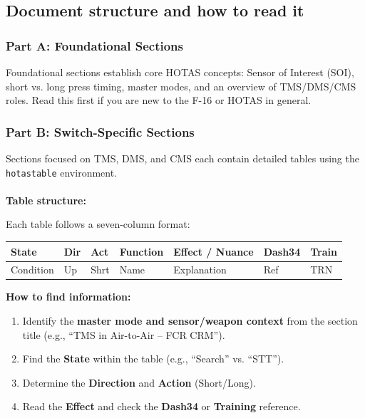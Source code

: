 \documentclass[11pt,a4paper]{article}
\begin{document}
\subsection{Document structure and how to read it}

\subsubsection{Part A: Foundational Sections}

Foundational sections establish core HOTAS concepts: Sensor of Interest (SOI), short vs. long press timing, master modes, and an overview of TMS/DMS/CMS roles. Read this first if you are new to the F-16 or HOTAS in general.

\subsubsection{Part B: Switch-Specific Sections}

Sections focused on TMS, DMS, and CMS each contain detailed tables using the \texttt{hotastable} environment.
\\\\
\textbf{Table structure:}

Each table follows a seven-column format:

\begin{center}
\begin{tabular}{L{1.6cm} L{1.0cm} L{1.0cm} L{3.4cm} L{5.8cm} L{1.4cm} L{1.4cm}}
\toprule
\textbf{State} & \textbf{Dir} & \textbf{Act} & \textbf{Function} & \textbf{Effect / Nuance} & \textbf{Dash34} & \textbf{Train} \\
\midrule
Condition & Up & Shrt & Name & Explanation & Ref & TRN \\
\bottomrule
\end{tabular}
\end{center}

\textbf{How to find information:}

\begin{enumerate}
\item Identify the \textbf{master mode and sensor/weapon context} from the section title (e.g., ``TMS in Air-to-Air -- FCR CRM'').
\item Find the \textbf{State} within the table (e.g., ``Search'' vs. ``STT'').
\item Determine the \textbf{Direction} and \textbf{Action} (Short/Long).
\item Read the \textbf{Effect} and check the \textbf{Dash34} or \textbf{Training} reference.
\end{enumerate}
\end{document}
